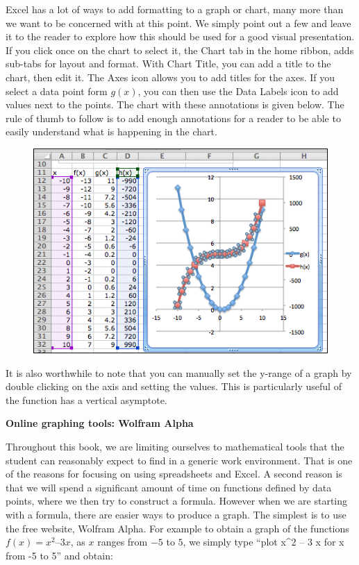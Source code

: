\documentclass[10pt,]{book}
\newcommand{\terminology}[1]{\textbf{#1}}
\theoremstyle{plain}
\theoremstyle{definition}
\theoremstyle{definition}
\begin{document}
Excel has a lot of ways to add formatting to a graph or chart, many more than we want to be concerned with at this point.  We simply point out a few and leave it to the reader to explore how this should be used for a good visual presentation.  If you click once on the chart to select it, the Chart tab in the home ribbon, adds sub-tabs for layout and format.  With Chart Title, you can add a title to the chart, then edit it.  The Axes icon allows you to add titles for the axes.  If you select a data point form \(g(x)\), you can then use the Data Labels icon to add values next to the points.  The chart with these annotations is given below.  The rule of thumb to follow is to add enough annotations for a reader to be able to easily understand what is happening in the chart.%
\leavevmode%
\begin{figure}
\centering
\includegraphics[width=0.8\linewidth]{images/sec1-4-12.png}
\end{figure}
\par
It is also worthwhile to note that you can manually set the y-range of a graph by double clicking on the axis and setting the values.  This is particularly useful of the function has a vertical asymptote.%
\par
\terminology{Online graphing tools: Wolfram Alpha}%
\par
Throughout this book, we are limiting ourselves to mathematical tools that the student can reasonably expect to find in a generic work environment.  That is one of the reasons for focusing on using spreadsheets and Excel.  A second reason is that we will spend a significant amount of time on functions defined by data points, where we then try to construct a formula.  However when we are starting with a formula, there are easier ways to produce a graph.  The simplest is to use the free website, Wolfram Alpha.  For example to obtain a graph of the functions \(f(x) = x^2 – 3 x\), as \(x\) ranges from \(-5\) to \(5\), we simply type “plot x\textasciicircum{}2 – 3 x for x from -5 to 5” and obtain:%
\end{document}
